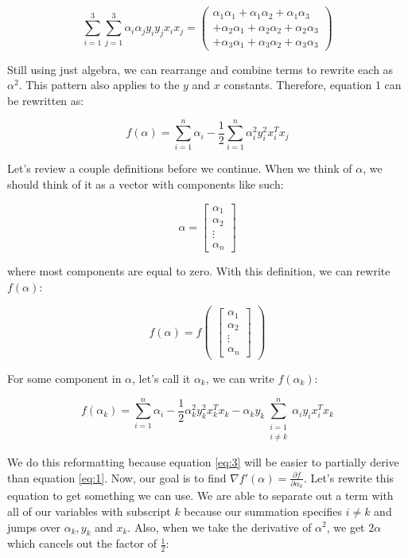 \[
\sum\limits_{i=1}^{3} \sum\limits_{j=1}^{3} \alpha_i \alpha_j y_i y_j x_i x_j = 
\begin{pmatrix}
\alpha_1\alpha_1 + \alpha_1\alpha_2 + \alpha_1\alpha_3 
\\
+ \alpha_2\alpha_1 + \alpha_2\alpha_2 + \alpha_2\alpha_3 
\\
+ \alpha_3\alpha_1 + \alpha_3\alpha_2 + \alpha_3\alpha_3
\end{pmatrix}
\]

Still using just algebra, we can rearrange and combine terms to rewrite each as $\alpha^2$. This pattern also applies to the $y$ and $x$ constants. Therefore, equation 1 can be rewritten as:

\begin{equation} \label{eq:2}
f(\alpha) = \sum\limits_{i=1}^{n} \alpha_i - \frac{1}{2} \sum\limits_{i=1}^{n} \alpha_i^2 y_i^2 x_i^T x_j
\end{equation}

Let's review a couple definitions before we continue. When we think of $\alpha$, we should think of it as a vector with components like such:

\[
\alpha = 
\begin{bmatrix} 
\alpha_1 \\ 
\alpha_2 \\ 
\vdots \\
\alpha_n
\end{bmatrix}
\]

where most components are equal to zero. With this definition, we can rewrite $f(\alpha)$:

\[
    f(\alpha) = f\begin{pmatrix}\begin{bmatrix} 
\alpha_1 \\ 
\alpha_2 \\ 
\vdots \\
\alpha_n
\end{bmatrix}\end{pmatrix}
\]

For some component in $\alpha$, let's call it $\alpha_k$, we can write $f(\alpha_k)$:

\begin{equation} \label{eq:3}
    f(\alpha_k) = \sum\limits_{i=1}^{n}\alpha_i - \frac{1}{2}\alpha_k^2 y_k^2 x_k^Tx_k - \alpha_k y_k \sum_{\substack{i=1 \\ i \ne k}}^n \alpha_i y_i x_i^Tx_k
\end{equation}

We do this reformatting because equation \ref{eq:3} will be easier to partially derive than equation \ref{eq:1}. Now, our goal is to find $\nabla f'(\alpha) = \frac{\partial f}{\partial \alpha_k}$. Let's rewrite this equation to get something we can use. We are able to separate out a term with all of our variables with subscript $k$ because our summation specifies $i \ne k$ and jumps over $\alpha_k, y_k$ and $x_k$. Also, when we take the derivative of $\alpha^2$, we get $2\alpha$ which cancels out the factor of $\frac{1}{2}$:

